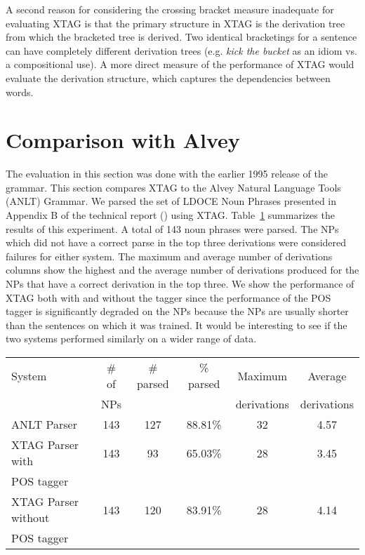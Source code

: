 A second reason for considering the crossing bracket measure 
inadequate for evaluating XTAG is that the primary structure in XTAG 
is the derivation tree from which the bracketed tree is derived. Two 
identical bracketings for a sentence can have completely different 
derivation trees (e.g. {\it kick the bucket} as an idiom vs. a 
compositional use). A more direct measure of the performance of XTAG 
would evaluate the derivation structure, which captures the 
dependencies between words. 
 
\section{Comparison with Alvey} 
 
The evaluation in this section was done with the earlier 1995 release 
of the grammar. This section compares XTAG to the Alvey Natural 
Language Tools (ANLT) Grammar. We parsed the set of LDOCE Noun Phrases 
presented in Appendix B of the technical report (\cite{Carroll93}) 
using XTAG.  Table~\ref{Alvey-xtag} summarizes the results of this 
experiment.  A total of 143 noun phrases were parsed. The NPs which 
did not have a correct parse in the top three derivations were 
considered failures for either system. The maximum and average number 
of derivations columns show the highest and the average number of 
derivations produced for the NPs that have a correct derivation in the 
top three.  We show the performance of XTAG both with and without the 
tagger since the performance of the POS tagger is significantly 
degraded on the NPs because the NPs are usually shorter than the 
sentences on which it was trained. It would be interesting to see if 
the two systems performed similarly on a wider range of data. 
 
\begin{table}[ht] 
\centering 
\begin{tabular}{|l|c|c|c|c|c|}  \hline 
System & \# of & \# parsed & \% parsed & Maximum & Average \\ 
& NPs &&& derivations & derivations \\ \hline 
ANLT Parser & 143 & 127 & 88.81\% & 32 & 4.57 \\ \hline 
XTAG Parser with & 143 & 93 & 65.03\% & 28 & 3.45 \\ 
POS tagger & & & & & \\ \hline 
XTAG Parser without & 143 & 120 & 83.91\% & 28 & 4.14\\ 
POS tagger & & & & & \\ \hline 
\end{tabular} \\ 
 
\vspace{0.1in} 
 
\begin{rawhtml} <dl> <dt>{Comparison of XTAG and ANLT Parser <p> </dl> \end{rawhtml}
\label{Alvey-xtag} 
\end{table} 
 
